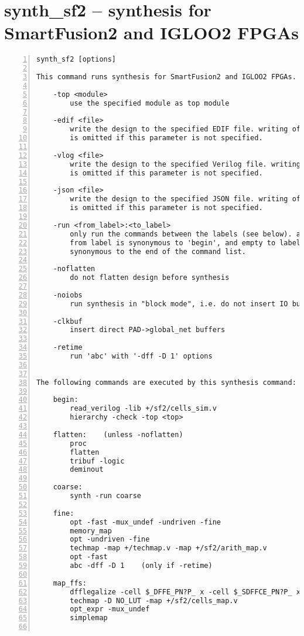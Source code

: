 \section{synth\_sf2 -- synthesis for SmartFusion2 and IGLOO2 FPGAs}
\label{cmd:synth_sf2}
\begin{lstlisting}[numbers=left,frame=single]
    synth_sf2 [options]

This command runs synthesis for SmartFusion2 and IGLOO2 FPGAs.

    -top <module>
        use the specified module as top module

    -edif <file>
        write the design to the specified EDIF file. writing of an output file
        is omitted if this parameter is not specified.

    -vlog <file>
        write the design to the specified Verilog file. writing of an output file
        is omitted if this parameter is not specified.

    -json <file>
        write the design to the specified JSON file. writing of an output file
        is omitted if this parameter is not specified.

    -run <from_label>:<to_label>
        only run the commands between the labels (see below). an empty
        from label is synonymous to 'begin', and empty to label is
        synonymous to the end of the command list.

    -noflatten
        do not flatten design before synthesis

    -noiobs
        run synthesis in "block mode", i.e. do not insert IO buffers

    -clkbuf
        insert direct PAD->global_net buffers

    -retime
        run 'abc' with '-dff -D 1' options


The following commands are executed by this synthesis command:

    begin:
        read_verilog -lib +/sf2/cells_sim.v
        hierarchy -check -top <top>

    flatten:    (unless -noflatten)
        proc
        flatten
        tribuf -logic
        deminout

    coarse:
        synth -run coarse

    fine:
        opt -fast -mux_undef -undriven -fine
        memory_map
        opt -undriven -fine
        techmap -map +/techmap.v -map +/sf2/arith_map.v
        opt -fast
        abc -dff -D 1    (only if -retime)

    map_ffs:
        dfflegalize -cell $_DFFE_PN?P_ x -cell $_SDFFCE_PN?P_ x -cell $_DLATCH_PN?_ x
        techmap -D NO_LUT -map +/sf2/cells_map.v
        opt_expr -mux_undef
        simplemap


\end{lstlisting}

